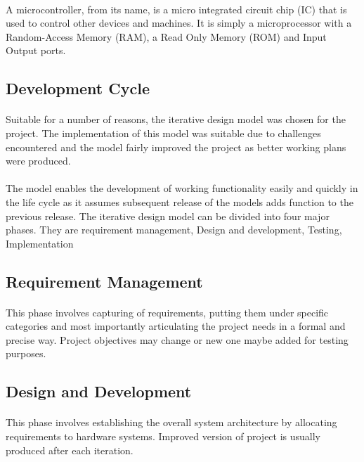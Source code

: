 \documentclass[12pt]{article}
\begin{document}
\paragraph*{}	
	A microcontroller, from its name, is a micro integrated circuit chip (IC) that is used to control other devices and machines. It is simply a microprocessor with a Random-Access Memory (RAM), a Read Only Memory (ROM) and Input Output ports.
\subsection*{Development Cycle}	
\paragraph*{} 
Suitable for a number of reasons, the iterative design model was chosen for the project. The implementation of this model was suitable due to challenges encountered and the model fairly improved the project as better working plans were produced. 
\paragraph*{}
	The model enables the development of working functionality easily and quickly in the life cycle as it assumes subsequent release of the models adds function to the previous release. The iterative design model can be divided into four major phases. They are requirement management, Design and development, Testing, Implementation
\subsection*{Requirement Management}
\paragraph*{}
This phase involves capturing of requirements, putting them under specific categories and most importantly articulating the project needs in a formal and precise way. Project objectives may change or new one maybe added for testing purposes.
\subsection*{Design and Development}
\paragraph*{}
This phase involves establishing the overall system architecture by allocating requirements to hardware systems. Improved version of project is usually produced after each iteration.
\end{document}
